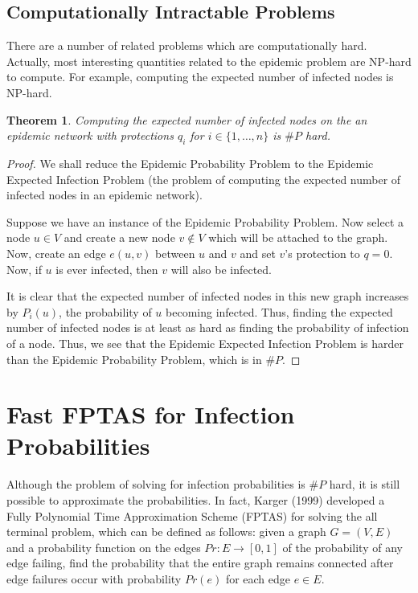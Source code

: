 \documentclass{article}
\theoremstyle{plain}
\newtheorem{theorem}{Theorem}
\begin{document}
\subsection{Computationally Intractable Problems}

There are a number of related problems which are computationally hard. Actually, most interesting quantities related to the epidemic problem are NP-hard to compute. For example, computing the expected number of infected nodes is NP-hard.

\begin{theorem}
  Computing the expected number of infected nodes on the an epidemic network with protections $q_i$ for $i \in \{1, \ldots, n\}$ is $\# P$ hard.
\end{theorem}
\begin{proof}
  We shall reduce the Epidemic Probability Problem to the Epidemic Expected Infection Problem (the problem of computing the expected number of infected nodes in an epidemic network).

  Suppose we have an instance of the Epidemic Probability Problem. Now select a node $u \in V$ and create a new node $v \not \in V$ which will be attached to the graph. Now, create an edge $e(u,v)$ between $u$ and $v$ and set $v$'s protection to $q = 0$. Now, if $u$ is ever infected, then $v$ will also be infected.

  It is clear that the expected number of infected nodes in this new graph increases by $P_i(u)$, the probability of $u$ becoming infected. Thus, finding the expected number of infected nodes is at least as hard as finding the probability of infection of a node. Thus, we see that the Epidemic Expected Infection Problem is harder than the Epidemic Probability Problem, which is in $\# P$.
\end{proof}

\section{Fast FPTAS for Infection Probabilities}

Although the problem of solving for infection probabilities is $\# P$ hard, it is still possible to approximate the probabilities. In fact, Karger (1999) developed a Fully Polynomial Time Approximation Scheme (FPTAS) for solving the all terminal problem, which can be defined as follows: given a graph $G = (V,E)$ and a probability function on the edges $Pr: E \to [0,1]$ of the probability of any edge failing, find the probability that the entire graph remains connected after edge failures occur with probability $Pr(e)$ for each edge $e \in E$.
\end{document}
